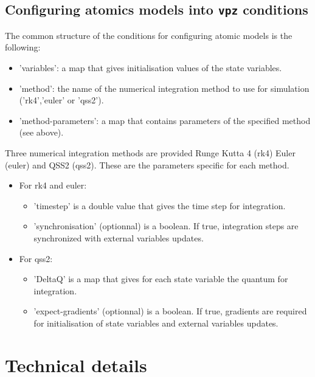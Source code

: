 \documentclass{article}
\theoremstyle{remark}
\begin{document}
\subsection{Configuring atomics models into {\tt vpz} conditions}
\label{sec:user:conf}

The common structure of the conditions for configuring atomic models is the
following:
\begin{itemize}
  \item 'variables': a map that gives initialisation values of the
  state variables.
  \item 'method': the name of the numerical integration method to use for
  simulation ('rk4','euler' or 'qss2').
  \item 'method-parameters': a map that contains parameters of the specified
  method (see above).
\end{itemize} 

Three numerical integration methods are provided Runge Kutta 4 (rk4) Euler
(euler) and QSS2 (qss2). These are the parameters specific for each method.
\begin{itemize}
  \item For rk4 and euler:
  \begin{itemize}
    \item  'timestep' is a double value that gives the time step for
    	integration.
  	\item 'synchronisation' (optionnal) is a boolean. If true, integration steps
  	are synchronized with external variables updates.
  \end{itemize}
  \item For qss2: 
  \begin{itemize}
    \item 'DeltaQ' is a map that gives for each state variable the 
  quantum for integration.
	\item 'expect-gradients' (optionnal) is a boolean. If true, gradients are
	required for initialisation of state variables and external variables updates. 
  \end{itemize}
\end{itemize}

\section{Technical details}
\end{document}
